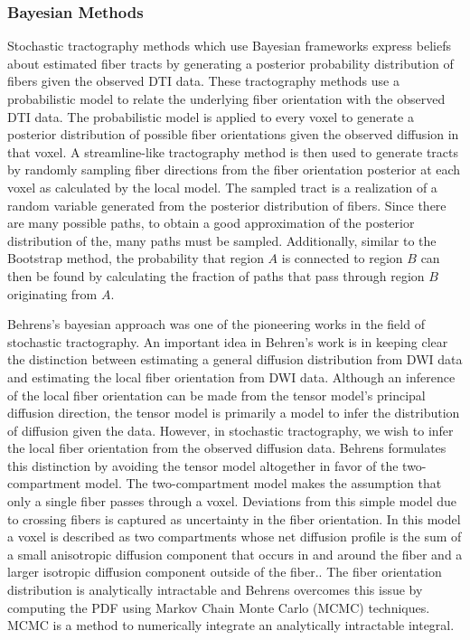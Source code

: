 \subsubsection{Bayesian Methods}
Stochastic tractography methods which use Bayesian frameworks express beliefs about estimated fiber tracts by generating a posterior probability distribution of fibers given the observed DTI data.   These tractography methods use a probabilistic model to relate the underlying fiber orientation with the observed DTI data.  The probabilistic model is applied to every voxel to generate a posterior distribution of possible fiber orientations given the observed diffusion in that voxel.  A streamline-like tractography method is then used to generate tracts by randomly sampling fiber directions from the fiber orientation posterior at each voxel as calculated by the local model.  The sampled tract is a realization of a random variable generated from the posterior distribution of fibers.  Since there are many possible paths, to obtain a good approximation of the posterior distribution of the, many paths must be sampled.  Additionally, similar to the Bootstrap method, the probability that region $A$ is connected to region $B$ can then be found by calculating the fraction of paths that pass through region $B$ originating from $A$.

Behrens's bayesian approach was one of the pioneering works in the field of stochastic tractography\cite{behrensMRM03}. An important idea in Behren's work is in keeping clear the distinction between estimating a general diffusion distribution from DWI data and estimating the local fiber orientation from DWI data.  Although an inference of the local fiber orientation can be made from the tensor model's principal diffusion direction, the tensor model is primarily a model to infer the distribution of diffusion given the data.  However, in stochastic tractography, we wish to infer the local fiber orientation from the observed diffusion data.  Behrens formulates this distinction by avoiding the tensor model altogether in favor of the two-compartment model. The two-compartment model makes the assumption that only a single fiber passes through a voxel.  Deviations from this simple model due to crossing fibers is captured as uncertainty in the fiber orientation.  In this model a voxel is described as two compartments whose net diffusion profile is the sum of a small anisotropic diffusion component that occurs in and around the fiber and a larger isotropic diffusion component outside of the fiber.\cite{behrensMRM03}.  The fiber orientation distribution is analytically intractable and Behrens overcomes this issue by computing the PDF using Markov Chain Monte Carlo (MCMC) techniques.  MCMC is a method to numerically integrate an analytically intractable integral.  
